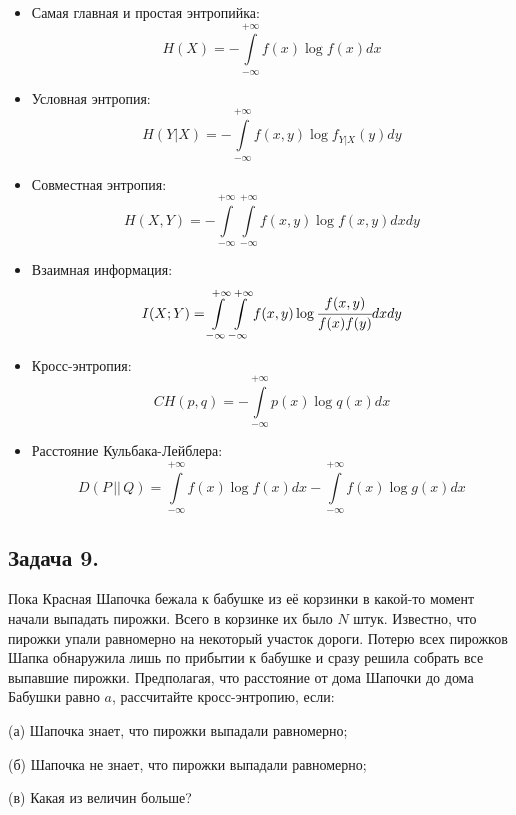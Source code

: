 \begin{itemize}
    \item Самая главная и простая энтропийка:
    \[H(X)=-\int\limits_{-\infty}^{+\infty} f(x)\log f(x)dx \]
    \item Условная энтропия:
    \[H(Y|X)=-\int\limits_{-\infty}^{+\infty} f(x, y)\log f_{Y|X}(y)dy \]
    \item Совместная энтропия:
    \[H(X, Y)=-\int\limits_{-\infty}^{+\infty} \int\limits_{-\infty}^{+\infty} f(x, y)\log f(x, y)dxdy \]
    \item Взаимная информация:
    \[I(X; Y)=\int\limits_{-\infty}^{+\infty} \int\limits_{-\infty}^{+\infty} f(x, y) \log \cfrac{f(x, y)}{f(x)f(y)}dxdy \]
    \item Кросс-энтропия:
    \[CH(p, q)=-\int\limits_{-\infty}^{+\infty}p(x)\log q(x) dx \]
    \item Расстояние Кульбака-Лейблера:
    \[D(P\, ||\, Q)=\int\limits_{-\infty}^{+\infty} f(x)\log f(x)dx -\int\limits_{-\infty}^{+\infty} f(x)\log g(x)dx  \]
\end{itemize}

\subsection*{Задача 9.} Пока Красная Шапочка бежала к бабушке из её корзинки в какой-то момент начали выпадать пирожки. Всего в корзинке их было $N$ штук. Известно, что пирожки упали равномерно на некоторый участок дороги. Потерю всех пирожков Шапка обнаружила лишь по прибытии к бабушке и сразу решила собрать все выпавшие пирожки. Предполагая, что расстояние от дома Шапочки до дома Бабушки равно $a$, рассчитайте кросс-энтропию, если:

(а) Шапочка знает, что пирожки выпадали равномерно;

(б) Шапочка не знает, что пирожки выпадали равномерно;

(в) Какая из величин больше?
